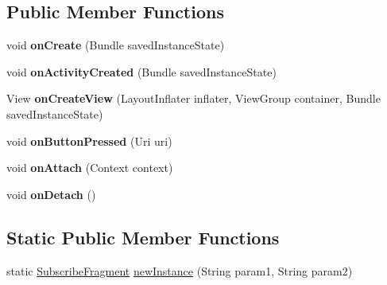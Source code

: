 \subsection*{Public Member Functions}
\begin{DoxyCompactItemize}
\item 
void {\bfseries on\+Create} (Bundle saved\+Instance\+State)\hypertarget{classcom_1_1example_1_1sel_1_1lostfound_1_1SubscribeFragment_a7f0cd7584a12208f6cc9e3c8fb1fd680}{}\label{classcom_1_1example_1_1sel_1_1lostfound_1_1SubscribeFragment_a7f0cd7584a12208f6cc9e3c8fb1fd680}

\item 
void {\bfseries on\+Activity\+Created} (Bundle saved\+Instance\+State)\hypertarget{classcom_1_1example_1_1sel_1_1lostfound_1_1SubscribeFragment_a6daae3059443ffda76c69cc51f2d9dec}{}\label{classcom_1_1example_1_1sel_1_1lostfound_1_1SubscribeFragment_a6daae3059443ffda76c69cc51f2d9dec}

\item 
View {\bfseries on\+Create\+View} (Layout\+Inflater inflater, View\+Group container, Bundle saved\+Instance\+State)\hypertarget{classcom_1_1example_1_1sel_1_1lostfound_1_1SubscribeFragment_a521224b1fa6e19b441cd064c636137f1}{}\label{classcom_1_1example_1_1sel_1_1lostfound_1_1SubscribeFragment_a521224b1fa6e19b441cd064c636137f1}

\item 
void {\bfseries on\+Button\+Pressed} (Uri uri)\hypertarget{classcom_1_1example_1_1sel_1_1lostfound_1_1SubscribeFragment_a018589e8d66394f7c11ec44d996fbdcf}{}\label{classcom_1_1example_1_1sel_1_1lostfound_1_1SubscribeFragment_a018589e8d66394f7c11ec44d996fbdcf}

\item 
void {\bfseries on\+Attach} (Context context)\hypertarget{classcom_1_1example_1_1sel_1_1lostfound_1_1SubscribeFragment_adc31ba19040d95af6b9ab1a11677f93d}{}\label{classcom_1_1example_1_1sel_1_1lostfound_1_1SubscribeFragment_adc31ba19040d95af6b9ab1a11677f93d}

\item 
void {\bfseries on\+Detach} ()\hypertarget{classcom_1_1example_1_1sel_1_1lostfound_1_1SubscribeFragment_a756f69f0e7f8f456fbbb077502d9494f}{}\label{classcom_1_1example_1_1sel_1_1lostfound_1_1SubscribeFragment_a756f69f0e7f8f456fbbb077502d9494f}

\end{DoxyCompactItemize}
\subsection*{Static Public Member Functions}
\begin{DoxyCompactItemize}
\item 
static \hyperlink{classcom_1_1example_1_1sel_1_1lostfound_1_1SubscribeFragment}{Subscribe\+Fragment} \hyperlink{classcom_1_1example_1_1sel_1_1lostfound_1_1SubscribeFragment_ac622c73212970653128ddfb06d38572a}{new\+Instance} (String param1, String param2)
\end{DoxyCompactItemize}


